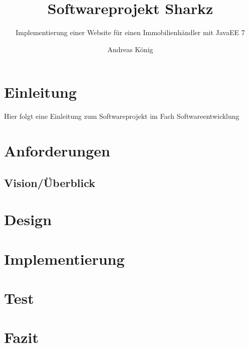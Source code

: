 \documentclass[a4paper]{scrreprt}
\begin{document}
\begin{titlepage}
	\title{Softwareprojekt Sharkz}
	\subtitle{Implementierung einer Website für einen Immobilienhändler mit JavaEE 7}
	\subject{Softwareentwicklung}
	\author{Andreas König}
	\maketitle
\end{titlepage}

\tableofcontents

\chapter{Einleitung}
Hier folgt eine Einleitung zum Softwareprojekt im Fach Softwareentwicklung

\chapter{Anforderungen}
\section{Vision/Überblick}

\chapter{Design}

\chapter{Implementierung}

\chapter{Test}

\chapter{Fazit}
\end{document}
